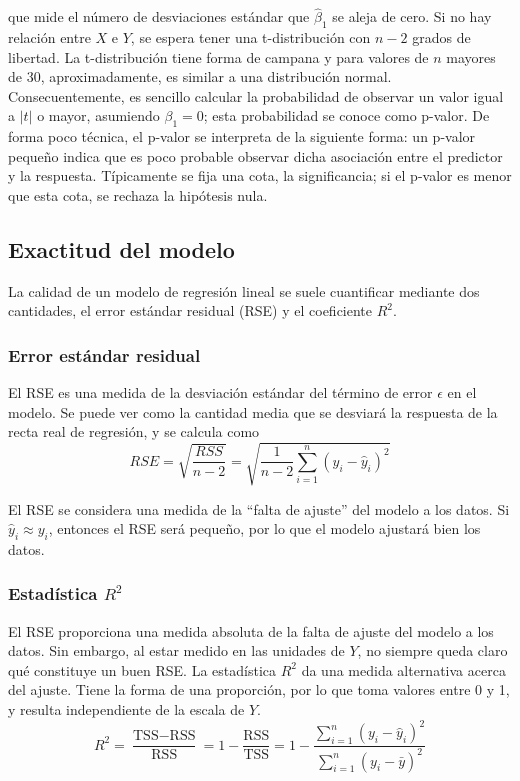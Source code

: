 que mide el número de desviaciones estándar que $\hat{\beta}_1$ se aleja de cero. Si no hay relación entre $X$ e $Y$, se espera tener una t-distribución con $n-2$ grados de libertad. La t-distribución tiene forma de campana y para valores de $n$ mayores de 30, aproximadamente, es similar a una distribución normal. Consecuentemente, es sencillo calcular la probabilidad de observar un valor igual a $|t|$ o mayor, asumiendo $\beta_1 = 0$; esta probabilidad se conoce como p-valor. De forma poco técnica, el p-valor se interpreta de la siguiente forma: un p-valor pequeño indica que es poco probable observar dicha asociación entre el predictor y la respuesta. Típicamente se fija una cota, la significancia; si el p-valor es menor que esta cota, se rechaza la hipótesis nula. 

\subsection{Exactitud del modelo}

La calidad de un modelo de regresión lineal se suele cuantificar mediante dos cantidades, el error estándar residual (RSE) y el coeficiente $R^2$. 

\subsubsection{Error estándar residual}

El RSE es una medida de la desviación estándar del término de error $\epsilon$ en el modelo. Se puede ver como la cantidad media que se desviará la respuesta de la recta real de regresión, y se calcula como 
\begin{equation}
RSE = \sqrt{\frac{RSS}{n-2}} = \sqrt{\frac{1}{n-2} \sum_{i=1}^n (y_i - \hat{y}_i)^2} 
\label{eq:3.15}
\end{equation}

El RSE se considera una medida de la ``falta de ajuste'' del modelo a los datos. Si $\hat{y}_i \approx y_i$, entonces el RSE será pequeño, por lo que el modelo ajustará bien los datos.

\subsubsection{Estadística $R^2$}

El RSE proporciona una medida absoluta de la falta de ajuste del modelo a los datos. Sin embargo, al estar medido en las unidades de $Y$, no siempre queda claro qué constituye un buen RSE. La estadística $R^2$  da una medida alternativa acerca del ajuste. Tiene la forma de una proporción, por lo que toma valores entre 0 y 1, y resulta independiente de la escala de $Y$. 
\begin{equation}
R^2 = \frac{\text{TSS} - \text{RSS}}{\text{RSS}} = 1 - \frac{\text{RSS}}{\text{TSS}} = 1 - \frac{\sum_{i=1}^n (y_i - \hat{y}_i)^2}{\sum_{i=1}^n (y_i - \bar{y})^2}
\end{equation}

